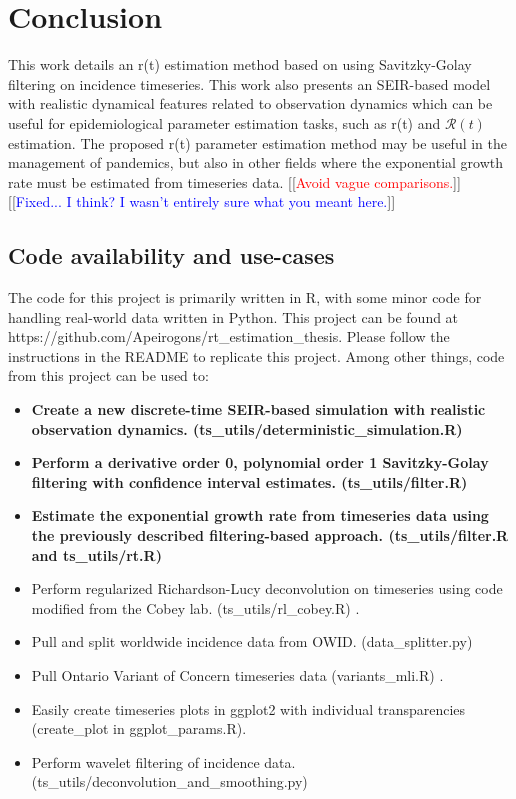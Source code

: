 \documentclass{article}
\newcommand{\nR}{\mathcal{R}}
\newcommand{\jd}[1]{[[\textcolor{red}{#1}]]}  \newcommand{\msComment}[1]{[[\textcolor{blue}{#1}]]}
\newcommand{\jd}[1]{} \newcommand{\msComment}[1]{}
\begin{document}
\section{Conclusion}
This work details an r(t) estimation method based on using Savitzky-Golay filtering on incidence timeseries. This work also presents an SEIR-based model with realistic dynamical features related to observation dynamics which can be useful for epidemiological parameter estimation tasks, such as r(t) and $\nR(t)$ estimation. The proposed r(t) parameter estimation method may be useful in the management of pandemics, but also in other fields where the exponential growth rate must be estimated from timeseries data. 
\jd{Avoid vague comparisons.} \msComment{Fixed... I think? I wasn't entirely sure what you meant here.}

\subsection{Code availability and use-cases}
The code for this project is primarily written in R, with some minor code for handling real-world data written in Python. This project can be found at https://github.com/Apeirogons/rt\_estimation\_thesis. Please follow the instructions in the README to replicate this project. Among other things, code from this project can be used to:

\begin{itemize}
	\item \textbf{Create a new discrete-time SEIR-based simulation with realistic observation dynamics. (ts\_utils/deterministic\_simulation.R)}
	\item \textbf{Perform a derivative order 0, polynomial order 1 Savitzky-Golay filtering with confidence interval estimates. (ts\_utils/filter.R)}
	\item \textbf{Estimate the exponential growth rate from timeseries data using the previously described filtering-based approach. (ts\_utils/filter.R and ts\_utils/rt.R)}
	\item Perform regularized Richardson-Lucy deconvolution on timeseries using code modified from the Cobey lab. (ts\_utils/rl\_cobey.R) \cite{Gostic}.
	\item Pull and split worldwide incidence data from OWID. (data\_splitter.py) \cite{OWID}
	\item Pull Ontario Variant of Concern timeseries data (variants\_mli.R) \cite{mli}.
	\item Easily create timeseries plots in ggplot2 with individual transparencies (create\_plot in ggplot\_params.R).
	\item Perform wavelet filtering of incidence data. (ts\_utils/deconvolution\_and\_smoothing.py)
\end{itemize}
\end{document}
